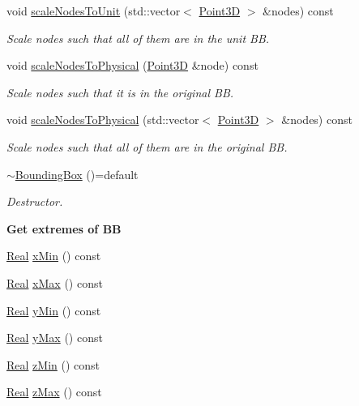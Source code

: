\begin{DoxyCompactItemize}
void \hyperlink{classFVCode3D_1_1BoundingBox_ac0db84eacec9c17ccb911bf1390c30ac}{scale\+Nodes\+To\+Unit} (std\+::vector$<$ \hyperlink{classFVCode3D_1_1Point3D}{Point3D} $>$ \&nodes) const 
\begin{DoxyCompactList}\small\item\em Scale nodes such that all of them are in the unit BB. \end{DoxyCompactList}\item 
void \hyperlink{classFVCode3D_1_1BoundingBox_ae45df69b786a19e4413691e1c64059d0}{scale\+Nodes\+To\+Physical} (\hyperlink{classFVCode3D_1_1Point3D}{Point3D} \&node) const 
\begin{DoxyCompactList}\small\item\em Scale nodes such that it is in the original BB. \end{DoxyCompactList}\item 
void \hyperlink{classFVCode3D_1_1BoundingBox_ab8cca9deb60b016cae9020873f626973}{scale\+Nodes\+To\+Physical} (std\+::vector$<$ \hyperlink{classFVCode3D_1_1Point3D}{Point3D} $>$ \&nodes) const 
\begin{DoxyCompactList}\small\item\em Scale nodes such that all of them are in the original BB. \end{DoxyCompactList}\item 
\hyperlink{classFVCode3D_1_1BoundingBox_a41ac5eca6ae3f4c556c5616074c13631}{$\sim$\+Bounding\+Box} ()=default
\begin{DoxyCompactList}\small\item\em Destructor. \end{DoxyCompactList}\end{DoxyCompactItemize}
\begin{Indent}{\bf Get extremes of BB}\par
\begin{DoxyCompactItemize}
\item 
\hyperlink{namespaceFVCode3D_a40c1f5588a248569d80aa5f867080e83}{Real} \hyperlink{classFVCode3D_1_1BoundingBox_a8406e82493459d67f7c6e01c41401b01}{x\+Min} () const 
\item 
\hyperlink{namespaceFVCode3D_a40c1f5588a248569d80aa5f867080e83}{Real} \hyperlink{classFVCode3D_1_1BoundingBox_a0ba4fbfa989d212c7f9df6b5ee440ef2}{x\+Max} () const 
\item 
\hyperlink{namespaceFVCode3D_a40c1f5588a248569d80aa5f867080e83}{Real} \hyperlink{classFVCode3D_1_1BoundingBox_a8d241063de29672a73e478ccef500fcd}{y\+Min} () const 
\item 
\hyperlink{namespaceFVCode3D_a40c1f5588a248569d80aa5f867080e83}{Real} \hyperlink{classFVCode3D_1_1BoundingBox_abcec6a60efb3a0bd3333bba6cb8c5eb4}{y\+Max} () const 
\item 
\hyperlink{namespaceFVCode3D_a40c1f5588a248569d80aa5f867080e83}{Real} \hyperlink{classFVCode3D_1_1BoundingBox_a332192fde3727b7de1c9864e98659ac1}{z\+Min} () const 
\item 
\hyperlink{namespaceFVCode3D_a40c1f5588a248569d80aa5f867080e83}{Real} \hyperlink{classFVCode3D_1_1BoundingBox_a9b1fee0fe7324865743f4029dd06e1a3}{z\+Max} () const 
\end{DoxyCompactItemize}
\end{Indent}
